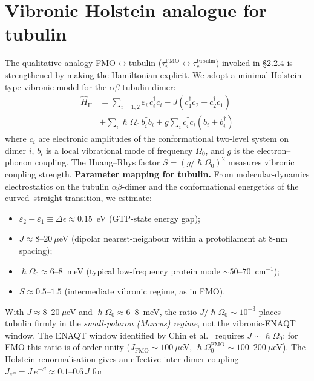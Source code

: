 \documentclass[twocolumn,10pt]{article}
\renewcommand{\hbar}{\hslash}
\begin{document}
\section{Vibronic Holstein analogue for tubulin}
\label{sec:holstein}
The qualitative analogy FMO$\leftrightarrow$tubulin
($\tau_v^{\text{FMO}}\leftrightarrow\tau_c^{\text{tubulin}}$) invoked in
\S 2.2.4 is strengthened by making the Hamiltonian explicit. We adopt a
minimal Holstein-type vibronic model \cite{Holstein1959,Chin2013} for the
$\alpha\beta$-tubulin dimer:
\begin{align}
\hat{H}_{\text{H}} &= \sum_{i=1,2}\varepsilon_i\,c_i^\dagger c_i
- J(c_1^\dagger c_2 + c_2^\dagger c_1) \\
&+ \sum_i \hbar\Omega_0\,b_i^\dagger b_i
+ g\sum_i c_i^\dagger c_i(b_i+b_i^\dagger)
\nonumber
\end{align}
where $c_i$ are electronic amplitudes of the conformational two-level
system on dimer $i$, $b_i$ is a local vibrational mode of frequency
$\Omega_0$, and $g$ is the electron--phonon coupling. The
Huang--Rhys factor $S=(g/\hbar\Omega_0)^2$ measures vibronic coupling
strength.
\textbf{Parameter mapping for tubulin.} From molecular-dynamics
electrostatics on the tubulin $\alpha\beta$-dimer \cite{Sept2003,Xiang2019}
and the conformational energetics of the curved--straight transition, we
estimate:
\begin{itemize}
\item $\varepsilon_2-\varepsilon_1\equiv\Delta\epsilon\approx 0.15$~eV
(GTP-state energy gap);
\item $J\approx 8\text{--}20~\mu$eV (dipolar nearest-neighbour within a
protofilament at 8-nm spacing);
\item $\hbar\Omega_0\approx 6\text{--}8$~meV (typical low-frequency
protein mode $\sim 50$--$70$~cm$^{-1}$);
\item $S\approx 0.5\text{--}1.5$ (intermediate vibronic regime, as in FMO).
\end{itemize}
With $J \approx 8\text{--}20~\mu$eV and $\hbar\Omega_0 \approx 6\text{--}8$~meV,
the ratio $J/\hbar\Omega_0 \sim 10^{-3}$ places tubulin firmly in the
\emph{small-polaron (Marcus) regime}, not the vibronic-ENAQT window.
The ENAQT window identified by Chin et al.\ \cite{Chin2013} requires
$J \sim \hbar\Omega_0$; for FMO this ratio is of order unity
($J_{\text{FMO}} \sim 100~\mu$eV, $\hbar\Omega_0^{\text{FMO}} \sim 100\text{--}200~\mu$eV).
The Holstein renormalisation gives an effective inter-dimer coupling
$J_{\text{eff}} = J\,e^{-S} \approx 0.1\text{--}0.6\,J$ for
\end{document}
